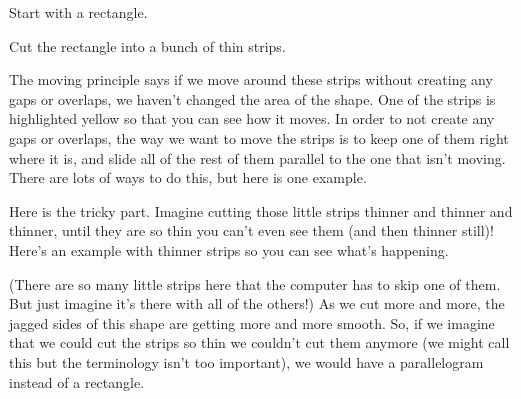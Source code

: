\documentclass{ximera}
\begin{document}
\begin{example}
Start with a rectangle.
\begin{image}
\end{image}
Cut the rectangle into a bunch of thin strips.
\begin{image}
\end{image}
The moving principle says if we move around these strips without creating any gaps or overlaps, we haven't changed the area of the shape. One of the strips is highlighted yellow so that you can see how it moves. In order to not create any gaps or overlaps, the way we want to move the strips is to keep one of them right where it is, and slide all of the rest of them parallel to the one that isn't moving. There are lots of ways to do this, but here is one example.
\begin{image}
\end{image}
Here is the tricky part. Imagine cutting those little strips thinner and thinner and thinner, until they are so thin you can't even see them (and then thinner still)! Here's an example with thinner strips so you can see what's happening.
\begin{image}
\end{image}
(There are so many little strips here that the computer has to skip one of them. But just imagine it's there with all of the others!) As we cut more and more, the jagged sides of this shape are getting more and more smooth. So, if we imagine that we could cut the strips so thin we couldn't cut them anymore (we might call this  but the terminology isn't too important), we would have a parallelogram instead of a rectangle.

\end{example}
\end{document}
